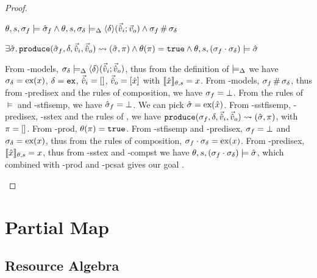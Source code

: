 \begin{proof}
\pfassume \begin{hypvlist}
 $\theta, s, \sigma_f \models \hat{\sigma}_f \land \theta, s, \sigma_\delta \models_{\Delta} \left<\delta\right>\!(\vec{\hat{v}}_i;\vec{v}_o) \land \sigma_f\operatorname{\#}\sigma_\delta$
\end{hypvlist}
\pfprove \begin{goalvlist}
 $\exists \hat{\sigma}\ldotp \texttt{produce}(\hat{\sigma}_f,\delta,\vec{\hat{v}}_i,\vec{\hat{v}}_o)\rightsquigarrow (\hat{\sigma},\pi) \land \theta(\pi)=\texttt{true} \land \theta,s,(\sigma_f\cdot\sigma_\delta) \models \hat{\sigma}$
\end{goalvlist}
\begin{hypvlist}
 From \hyp{models}, $\sigma_\delta\models_{\Delta} \left<\delta\right>\!(\vec{\hat{v}}_i;\vec{\hat{v}}_o)$, thus from the definition of $\models_{\Delta}$ we have $\sigma_\delta=\text{ex}(x)$, $\delta=\texttt{ex}$, $\vec{\hat{v}}_i=[]$, $\vec{\hat{v}}_o=[\hat{x}]$ with $\llbracket\hat{x}\rrbracket_{\theta,s}=x$.
 From \hyp{models}, $\sigma_f\operatorname{\#}\sigma_\delta$, thus from \hyp{predisex} and the rules of composition, we have $\sigma_f=\bot$.
 From the rules of $\models$ and \hyp{stfisemp}, we have $\hat{\sigma}_f=\bot$.
 We can pick $\hat{\sigma}=\text{ex}(\hat{x})$.
 From \hyp{sstfisemp}, \hyp{predisex}, \hyp{sstex} and the rules of \produce, we have ${\texttt{produce}(\sigma_f,\delta,\vec{\hat{v}}_i,\vec{\hat{v}}_o)\rightsquigarrow (\hat{\sigma},\pi)}$, with $\pi=[]$.
 From \hyp{prod}, $\theta(\pi)=\texttt{true}$.
 From \hyp{stfisemp} and \hyp{predisex}, $\sigma_f=\bot$ and $\sigma_\delta=\text{ex}(x)$, thus from the rules of composition, $\sigma_f\cdot\sigma_\delta=\text{ex}(x)$. 
 From \hyp{predisex}, $\llbracket\hat{x}\rrbracket_{\theta,s}=x$, thus from \hyp{sstex} and \hyp{compst} we have $\theta,s,(\sigma_f\cdot\sigma_\delta)\models\hat{\sigma}$, which combined with \hyp{prod} and \hyp{pcsat} gives our goal .
\end{hypvlist}

\end{proof}

\section{Partial Map}

\subsection{Resource Algebra}

